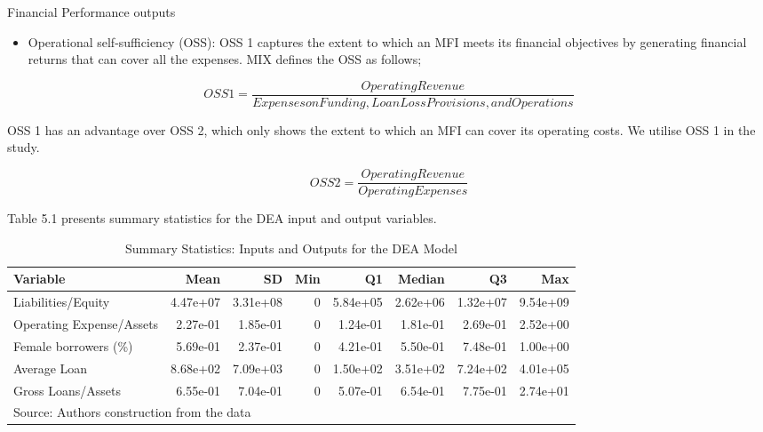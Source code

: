 \documentclass[a4paper, nobind]{templates/ociamthesis}
\providecommand{\tightlist}{%
  \setlength{\itemsep}{0pt}\setlength{\parskip}{0pt}}
\begin{document}
\vspace{5mm}

Financial Performance outputs
\vspace{2mm}

\begin{itemize}
\tightlist
\item
  Operational self-sufficiency (OSS): OSS 1 captures the extent to which an MFI meets its financial objectives by generating financial returns that can cover all the expenses. MIX defines the OSS as follows;
\end{itemize}

\begin{equation}
OSS1 = \frac{Operating Revenue}{Expenses on Funding, Loan Loss Provisions, and Operations}
\end{equation}

OSS 1 has an advantage over OSS 2, which only shows the extent to which an MFI can cover its operating costs. We utilise OSS 1 in the study.

\begin{equation}
OSS2 = \frac{Operating Revenue}{Operating Expenses}
\end{equation}

Table 5.1 presents summary statistics for the DEA input and output variables.

\begin{table}

\caption{\label{tab:unnamed-chunk-115}Summary Statistics: Inputs and Outputs for the DEA Model}
\centering
\fontsize{10}{12}\selectfont
\begin{tabular}[t]{lrrrrrrr}
\toprule
Variable & Mean & SD & Min & Q1 & Median & Q3 & Max\\
\midrule
Liabilities/Equity & 4.47e+07 & 3.31e+08 & 0 & 5.84e+05 & 2.62e+06 & 1.32e+07 & 9.54e+09\\
Operating Expense/Assets & 2.27e-01 & 1.85e-01 & 0 & 1.24e-01 & 1.81e-01 & 2.69e-01 & 2.52e+00\\
Female borrowers (\%) & 5.69e-01 & 2.37e-01 & 0 & 4.21e-01 & 5.50e-01 & 7.48e-01 & 1.00e+00\\
Average Loan & 8.68e+02 & 7.09e+03 & 0 & 1.50e+02 & 3.51e+02 & 7.24e+02 & 4.01e+05\\
Gross Loans/Assets & 6.55e-01 & 7.04e-01 & 0 & 5.07e-01 & 6.54e-01 & 7.75e-01 & 2.74e+01\\
\bottomrule
\multicolumn{8}{l}{\rule{0pt}{1em}Source: Authors construction from the data}\\
\end{tabular}
\end{table}
\end{document}
